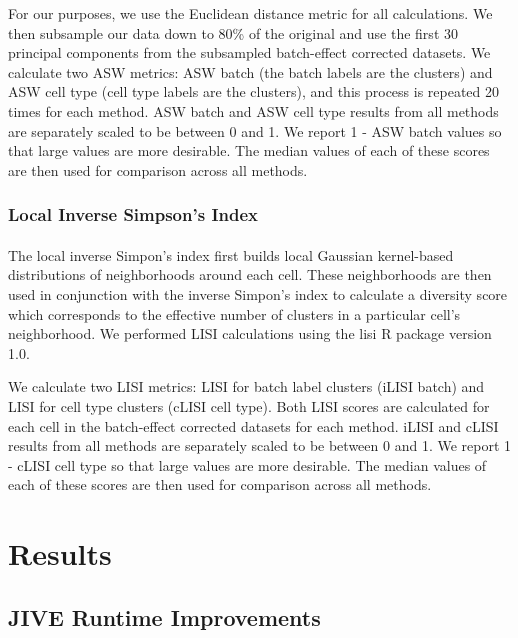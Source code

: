 \documentclass[
12pt, %
letterpaper, %
oneside, %
headinclude,footinclude, %
BCOR5mm, %
]{scrartcl}
\begin{document}
For our purposes, we use the Euclidean distance metric for all calculations. We then subsample our data down to 80\% of the original and use the first 30 principal components from the subsampled batch-effect corrected datasets. We calculate two ASW metrics: ASW batch (the batch labels are the clusters) and ASW cell type (cell type labels are the clusters), and this process is repeated 20 times for each method. ASW batch and ASW cell type results from all methods are separately scaled to be between 0 and 1. We report 1 - ASW batch values so that large values are more desirable. The median values of each of these scores are then used for comparison across all methods.

\subsubsection*{Local Inverse Simpson's Index}

\paragraph*{}
The local inverse Simpon's index \citep{korsunsky2019fast} first builds local Gaussian kernel-based distributions of neighborhoods around each cell. These neighborhoods are then used in conjunction with the inverse Simpon's index to calculate a diversity score which corresponds to the effective number of clusters in a particular cell's neighborhood. We performed LISI calculations using the lisi R package \citep{korsunky2019lisi} version 1.0.

We calculate two LISI metrics: LISI for batch label clusters (iLISI batch) and LISI for cell type clusters (cLISI cell type). Both LISI scores are calculated for each cell in the batch-effect corrected datasets for each method. iLISI and cLISI results from all methods are separately scaled to be between 0 and 1. We report 1 - cLISI cell type so that large values are more desirable. The median values of each of these scores are then used for comparison across all methods.


\section{Results}

\subsection{JIVE Runtime Improvements}
\end{document}
